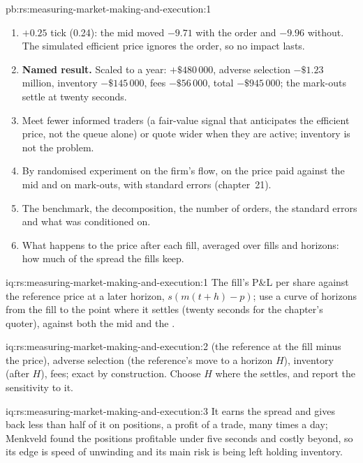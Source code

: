 \begin{solution}{pb:rs:measuring-market-making-and-execution:1}
\begin{enumerate}
\item $+0.25$ tick (0.24): the mid moved $-9.71$ with the order and $-9.96$ without. The simulated efficient price ignores the order, so no impact lasts.
\item \textbf{Named result.} Scaled to a year:  $+\$480\,000$, adverse selection $-\$1.23$ million, inventory $-\$145\,000$, fees $-\$56\,000$, total
$-\$945\,000$; the mark-outs settle at twenty seconds.
\item Meet fewer informed traders (a fair-value signal that anticipates the efficient price, not the queue alone) or quote wider when they are active; inventory is
not the problem.
\item By randomised experiment on the firm's flow, on the price paid against the mid and on mark-outs, with standard errors (chapter~21).
\item The benchmark, the decomposition, the number of orders, the standard errors and what was conditioned on.
\item What happens to the price after each fill, averaged over fills and horizons: how much of the spread the fills keep.
\end{enumerate}
\end{solution}

\begin{solution}{iq:rs:measuring-market-making-and-execution:1}
The fill's P\&L per share against the reference price at a later horizon, $s(m(t+h) - p)$; use a curve of horizons from the fill to the point where it settles
(twenty seconds for the chapter's quoter), against both the mid and the .
\end{solution}

\begin{solution}{iq:rs:measuring-market-making-and-execution:2}
 (the reference at the fill minus the price), adverse selection (the reference's move to a horizon $H$), inventory (after $H$), fees; exact by
construction. Choose $H$ where the  settles, and report the sensitivity to it.
\end{solution}

\begin{solution}{iq:rs:measuring-market-making-and-execution:3}
It earns the spread and gives back less than half of it on positions, a profit of  a trade, many times a day; Menkveld found the positions profitable
under five seconds and costly beyond, so its edge is speed of unwinding and its main risk is being left holding inventory.
\end{solution}

